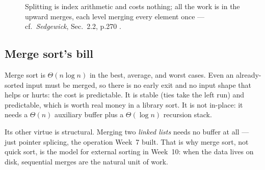 \documentclass[11pt]{article}
\begin{document}
\begin{figure}[h]
  \centering
  \caption{Splitting is index arithmetic and costs nothing; all the work is in the upward merges, each level merging every element once --- cf.\ \textit{Sedgewick}, Sec.~2.2, p.270 \cite{Sedgewick2011_algorithms}.}
\end{figure}

\subsection{Merge sort's bill}

Merge sort is $\Theta(n\log n)$ in the best, average, and worst cases. Even an already-sorted input must be merged, so there is no early exit and no input shape that helps or hurts: the cost is predictable. It is stable (ties take the left run) and predictable, which is worth real money in a library sort. It is not in-place: it needs a $\Theta(n)$ auxiliary buffer plus a $\Theta(\log n)$ recursion stack.

Its other virtue is structural. Merging two \emph{linked lists} needs no buffer at all --- just pointer splicing, the operation Week~7 built. That is why merge sort, not quick sort, is the model for external sorting in Week~10: when the data lives on disk, sequential merges are the natural unit of work.
\end{document}
